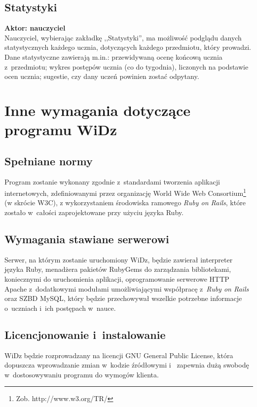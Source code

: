 \documentclass[12pt,leqno,twoside]{mwart}
\begin{document}
\subsection{Statystyki}
\begin{description}
\item \textbf{Aktor: nauczyciel}\\
Nauczyciel, wybierając zakładkę ,,Statystyki'', ma możliwość podglądu danych statystycznych każdego ucznia, dotyczących każdego przedmiotu, który prowadzi. Dane statystyczne zawierają m.in.: przewidywaną ocenę końcową ucznia z~przedmiotu; wykres postępów ucznia (co do tygodnia), liczonych na podstawie ocen ucznia; sugestie, czy dany uczeń powinien zostać odpytany.
\end{description}

\section{Inne wymagania dotyczące programu WiDz}\label{SPRZET}
\subsection{Spełniane normy}
\noindent Program zostanie wykonany zgodnie z~standardami tworzenia aplikacji internetowych, zdefiniowanymi przez organizację World Wide Web Consortium\footnote{Zob. http://www.w3.org/TR/} (w skrócie W3C), z wykorzystaniem środowiska ramowego \textit{Ruby on Rails}, które zostało w~całości zaprojektowane przy użyciu języka Ruby.

\subsection{Wymagania stawiane serwerowi}
\noindent Serwer, na którym zostanie uruchomiony WiDz, będzie zawierał interpreter języka Ruby, menadżera pakietów RubyGems do zarządzania bibliotekami, koniecznymi do uruchomienia aplikacji, oprogramowanie serwerowe HTTP Apache z~dodatkowymi modułami umożliwiającymi współpracę z~\textit{Ruby on Rails} oraz SZBD MySQL, który będzie przechowywał wszelkie potrzebne informacje o~uczniach i~ich postępach w~nauce.

\subsection{Licencjonowanie i~instalowanie}
\noindent WiDz będzie rozprowadzany na licencji GNU General Public License, która dopuszcza wprowadzanie zmian w~kodzie źródłowymi i~ zapewnia dużą swobodę w~dostosowywaniu programu do wymogów klienta.
\end{document}
